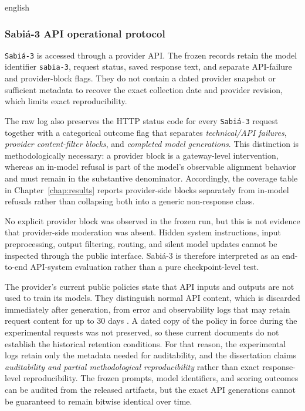 \begin{otherlanguage*}{english}
\subsubsection{Sabiá-3 API operational protocol}

\texttt{Sabiá-3} is accessed through a provider API. The frozen records retain the model identifier \texttt{sabia-3}, request status, saved response text, and separate API-failure and provider-block flags. They do not contain a dated provider snapshot or sufficient metadata to recover the exact collection date and provider revision, which limits exact reproducibility.

The raw log also preserves the HTTP status code for every \texttt{Sabiá-3} request together with a categorical outcome flag that separates \emph{technical/API failures}, \emph{provider content-filter blocks}, and \emph{completed model generations}. This distinction is methodologically necessary: a provider block is a gateway-level intervention, whereas an in-model refusal is part of the model's observable alignment behavior and must remain in the substantive denominator. Accordingly, the coverage table in Chapter~\ref{chap:results} reports provider-side blocks separately from in-model refusals rather than collapsing both into a generic non-response class.

No explicit provider block was observed in the frozen run, but this is not evidence that provider-side moderation was absent. Hidden system instructions, input preprocessing, output filtering, routing, and silent model updates cannot be inspected through the public interface. Sabiá-3 is therefore interpreted as an end-to-end API-system evaluation rather than a pure checkpoint-level test.

The provider's current public policies state that API inputs and outputs are not used to train its models. They distinguish normal API content, which is discarded immediately after generation, from error and observability logs that may retain request content for up to 30 days \cite{maritaca_data_retention_2025,maritacaAITermsConditions2025}. A dated copy of the policy in force during the experimental requests was not preserved, so these current documents do not establish the historical retention conditions. For that reason, the experimental logs retain only the metadata needed for auditability, and the dissertation claims \emph{auditability and partial methodological reproducibility} rather than exact response-level reproducibility. The frozen prompts, model identifiers, and scoring outcomes can be audited from the released artifacts, but the exact API generations cannot be guaranteed to remain bitwise identical over time.


\end{otherlanguage*}
